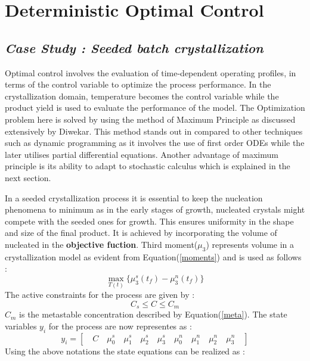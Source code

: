 \documentclass[3p,times,authoryear]{elsarticle}
\begin{document}
\section{Deterministic Optimal Control}\label{secdet}

\subsection{\textit{Case Study : Seeded batch crystallization}}
Optimal control involves the evaluation of time-dependent operating profiles, in terms of the control variable to optimize the process performance. In the crystallization domain, temperature becomes the control variable while the product yield is used to evaluate the performance of the model. The Optimization problem here is solved by using the method of Maximum Principle as discussed extensively by Diwekar\cite{diwekar}. This method stands out in compared to other techniques such as dynamic programming as it involves the use of first order ODEs while the later utilises partial differential equations. Another advantage of maximum principle is its ability to adapt to stochastic calculus which is explained in the next section. \par 
In a seeded crystallization process it is essential to keep the nucleation phenomena to minimum as in the early stages of growth, nucleated crystals might compete with the seeded ones for growth. This ensures uniformity in the shape and size of the final product. It is achieved by incorporating the volume of nucleated in the \textbf{objective fuction}. Third moment($\mu_{3}$) represents volume in a crystallization model as evident from Equation(\ref{moments}) and is used as follows :
\begin{equation}
\max_{T(t)}\lbrace{\mu_{3}^{s}(t_{f}) - \mu_{3}^{n}(t_{f})\rbrace } 
\end{equation}
The active constraints for the process are given by : 
\begin{equation}
C_{s}\leqslant C \leqslant C_{m}
\end{equation}
$C_{m}$ is the metastable concentration described by Equation(\ref{meta}). The state variables $y_{i}$ for the process are now representes as : 
\begin{equation} \label{states}
y_{i} = \left[\quad C \quad \mu_{0}^{s} \quad \mu_{1}^{s}\quad \mu_{2}^{s}\quad \mu_{3}^{s}\quad \mu_{0}^{n}\quad \mu_{1}^{n}\quad \mu_{2}^{n}\quad \mu_{3}^{n}\quad\right]  
\end{equation}
Using the above notations the state equations can be realized as \cite{yenkie} :
\end{document}
